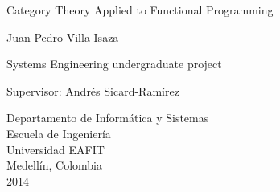 \begin{titlepage}

  \begin{center}

    {\LARGE Category Theory Applied to Functional Programming}

    \vspace*{\fill}

    {\large Juan Pedro Villa Isaza}

    \vspace*{\fill}

    {\large Systems Engineering undergraduate project}


    \vspace*{\fill}

    {\large Supervisor:}
    {\large Andrés Sicard-Ramírez}

    \vspace*{\fill}

    {\large Departamento de Informática y Sistemas}\\
    {\large Escuela de Ingeniería}\\
    {\large Universidad EAFIT}\\
    {\large Medellín, Colombia}\\
    {\large 2014}

  \end{center}

\end{titlepage}

\clearemptydoublepage

